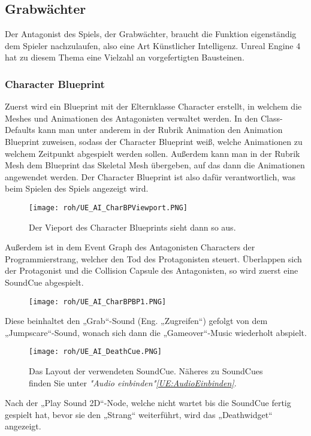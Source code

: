 \subsection{Grabwächter}
Der Antagonist des Spiels, der Grabwächter, braucht die Funktion eigenständig dem Spieler nachzulaufen, also eine Art Künstlicher Intelligenz. Unreal Engine 4 hat zu diesem Thema eine Vielzahl an vorgefertigten Bausteinen.
\subsubsection{Character Blueprint}
Zuerst wird ein Blueprint mit der Elternklasse Character erstellt, in welchem die Meshes und Animationen des Antagonisten verwaltet werden. In den Class-Defaults kann man unter anderem in der Rubrik Animation den Animation Blueprint zuweisen, sodass der Character Blueprint weiß, welche Animationen zu welchem Zeitpunkt abgespielt werden sollen. Außerdem kann man in der Rubrik Mesh dem Blueprint das Skeletal Mesh übergeben, auf das dann die Animationen angewendet werden. Der Character Blueprint ist also dafür verantwortlich, was beim Spielen des Spiels angezeigt wird.
\begin{figure}[H]
    \centering
    \texttt{[image: roh/UE\_AI\_CharBPViewport.PNG]}
    \caption{Der Vieport des Character Blueprints sieht dann so aus.}
    \label{UE:AI_CharBPViewport}
\end{figure}
Außerdem ist in dem Event Graph des Antagonisten Characters der Programmierstrang, welcher den Tod des Protagonisten steuert. Überlappen sich der Protagonist und die Collision Capsule des Antagonisten, so wird zuerst eine SoundCue abgespielt.
\begin{figure}[H]
    \centering
    \texttt{[image: roh/UE\_AI\_CharBPBP1.PNG]}
    \label{UE:AI_CharBPBP1}
\end{figure}
Diese beinhaltet den „Grab“-Sound (Eng. „Zugreifen“) gefolgt von dem „Jumpscare“-Sound, wonach sich dann die „Gameover“-Music wiederholt abspielt.
\begin{figure}[H]
    \centering
    \texttt{[image: roh/UE\_AI\_DeathCue.PNG]}
    \caption{Das Layout der verwendeten SoundCue. Näheres zu SoundCues finden Sie unter \textit{"Audio einbinden"\ref{UE:AudioEinbinden}}.}
    \label{UE:AI_DeathCue}
\end{figure}
Nach der „Play Sound 2D“-Node, welche nicht wartet bis die SoundCue fertig gespielt hat, bevor sie den „Strang“ weiterführt, wird das „Deathwidget“ angezeigt.
